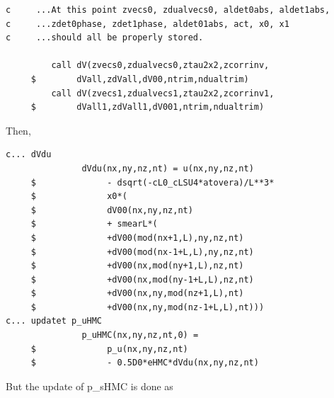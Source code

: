 \documentclass[10pt]{book}
\begin{document}
\begin{lstlisting}[frame=single]
c     ...At this point zvecs0, zdualvecs0, aldet0abs, aldet1abs,
c     ...zdet0phase, zdet1phase, aldet01abs, act, x0, x1 
c     ...should all be properly stored.

         call dV(zvecs0,zdualvecs0,ztau2x2,zcorrinv,
     $        dVall,zdVall,dV00,ntrim,ndualtrim)
         call dV(zvecs1,zdualvecs1,ztau2x2,zcorrinv1,
     $        dVall1,zdVall1,dV001,ntrim,ndualtrim)

\end{lstlisting}
Then,
\begin{lstlisting}[frame=single]
c... dVdu
               dVdu(nx,ny,nz,nt) = u(nx,ny,nz,nt)
     $              - dsqrt(-cL0_cLSU4*atovera)/L**3*
     $              x0*(
     $              dV00(nx,ny,nz,nt)
     $              + smearL*(
     $              +dV00(mod(nx+1,L),ny,nz,nt)
     $              +dV00(mod(nx-1+L,L),ny,nz,nt)
     $              +dV00(nx,mod(ny+1,L),nz,nt)
     $              +dV00(nx,mod(ny-1+L,L),nz,nt)
     $              +dV00(nx,ny,mod(nz+1,L),nt)
     $              +dV00(nx,ny,mod(nz-1+L,L),nt)))
c... updatet p_uHMC     
               p_uHMC(nx,ny,nz,nt,0) =
     $              p_u(nx,ny,nz,nt)
     $              - 0.5D0*eHMC*dVdu(nx,ny,nz,nt)
\end{lstlisting}
But the update of p\_sHMC is done as
\end{document}
